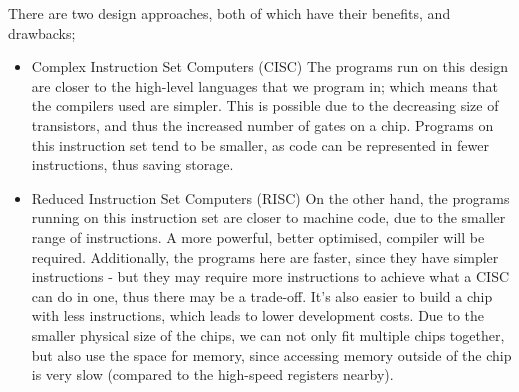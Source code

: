 \documentclass[a4paper, 12pt]{article}
\begin{document}
            There are two design approaches, both of which have their benefits, and drawbacks;
            \begin{itemize}
                \itemsep0em
                \item Complex Instruction Set Computers (CISC)
                    \subitem The programs run on this design are closer to the high-level languages that we program in; which means that the compilers used are simpler. This is possible due to the decreasing size of transistors, and thus the increased number of gates on a chip. Programs on this instruction set tend to be smaller, as code can be represented in fewer instructions, thus saving storage.
                \item Reduced Instruction Set Computers (RISC)
                    \subitem On the other hand, the programs running on this instruction set are closer to machine code, due to the smaller range of instructions. A more powerful, better optimised, compiler will be required. Additionally, the programs here are faster, since they have simpler instructions - but they may require more instructions to achieve what a CISC can do in one, thus there may be a trade-off. It's also easier to build a chip with less instructions, which leads to lower development costs. Due to the smaller physical size of the chips, we can not only fit multiple chips together, but also use the space for memory, since accessing memory outside of the chip is very slow (compared to the high-speed registers nearby).
            \end{itemize}
\end{document}
